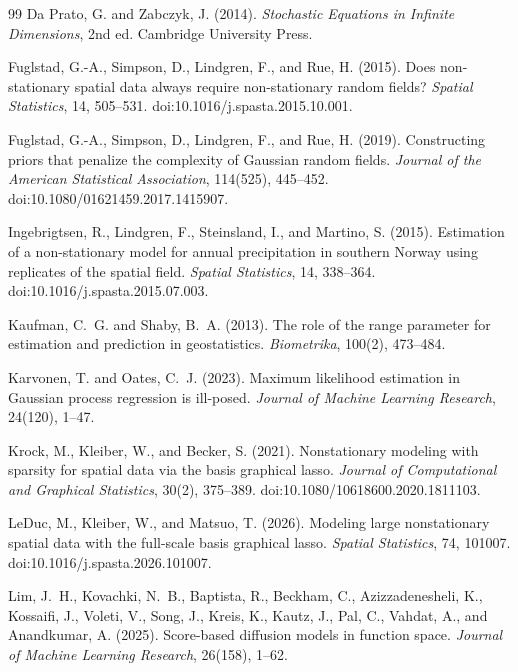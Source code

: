 \documentclass[11pt]{article}
\numberwithin{table}{section}
\numberwithin{figure}{section}
\begin{document}
{\begin{thebibliography}{99}
Da Prato, G. and Zabczyk, J. (2014).
\emph{Stochastic Equations in Infinite Dimensions}, 2nd ed.
Cambridge University Press.

Fuglstad, G.-A., Simpson, D., Lindgren, F., and Rue, H. (2015).
Does non-stationary spatial data always require non-stationary random fields?
\emph{Spatial Statistics}, 14, 505--531.
doi:10.1016/j.spasta.2015.10.001.

Fuglstad, G.-A., Simpson, D., Lindgren, F., and Rue, H. (2019).
Constructing priors that penalize the complexity of Gaussian random fields.
\emph{Journal of the American Statistical Association}, 114(525), 445--452.
doi:10.1080/01621459.2017.1415907.

Ingebrigtsen, R., Lindgren, F., Steinsland, I., and Martino, S. (2015).
Estimation of a non-stationary model for annual precipitation in southern Norway using replicates of the spatial field.
\emph{Spatial Statistics}, 14, 338--364.
doi:10.1016/j.spasta.2015.07.003.

Kaufman, C.~G. and Shaby, B.~A. (2013).
The role of the range parameter for estimation and prediction in geostatistics.
\emph{Biometrika}, 100(2), 473--484.

Karvonen, T. and Oates, C.~J. (2023).
Maximum likelihood estimation in Gaussian process regression is ill-posed.
\emph{Journal of Machine Learning Research}, 24(120), 1--47.

Krock, M., Kleiber, W., and Becker, S. (2021).
Nonstationary modeling with sparsity for spatial data via the basis graphical lasso.
\emph{Journal of Computational and Graphical Statistics}, 30(2), 375--389.
doi:10.1080/10618600.2020.1811103.

LeDuc, M., Kleiber, W., and Matsuo, T. (2026).
Modeling large nonstationary spatial data with the full-scale basis graphical lasso.
\emph{Spatial Statistics}, 74, 101007.
doi:10.1016/j.spasta.2026.101007.

Lim, J.~H., Kovachki, N.~B., Baptista, R., Beckham, C., Azizzadenesheli, K.,
Kossaifi, J., Voleti, V., Song, J., Kreis, K., Kautz, J., Pal, C.,
Vahdat, A., and Anandkumar, A. (2025).
Score-based diffusion models in function space.
\emph{Journal of Machine Learning Research}, 26(158), 1--62.


\end{thebibliography}}
\end{document}
